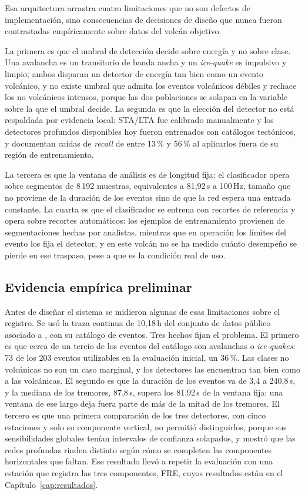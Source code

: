 Esa arquitectura arrastra cuatro limitaciones que no son defectos de
implementación, sino consecuencias de decisiones de diseño que nunca fueron
contrastadas empíricamente sobre datos del volcán objetivo.

La primera es que el umbral de detección decide sobre energía y no
sobre clase. Una avalancha es un transitorio de banda ancha y un
\emph{ice-quake} es impulsivo y limpio; ambos disparan un detector de energía
tan bien como un evento volcánico, y no existe umbral que admita los eventos
volcánicos débiles y rechace los no volcánicos intensos, porque las dos
poblaciones se solapan en la variable sobre la que el umbral decide. La segunda
es que la elección del detector no está respaldada por evidencia local:
STA/LTA fue calibrado manualmente y los detectores profundos disponibles hoy
fueron entrenados con catálogos tectónicos, y \textcite{jiang2021comparacion}
documentan caídas de \emph{recall} de entre 13\,\% y 56\,\% al aplicarlos fuera
de su región de entrenamiento.

La tercera es que la ventana de análisis es de longitud fija: el
clasificador opera sobre segmentos de 8\,192 muestras, equivalentes a 81,92\,s
a 100\,Hz, tamaño que no proviene de la duración de los eventos sino de que la
red espera una entrada constante. La cuarta es que el clasificador se
entrena con recortes de referencia y opera sobre recortes automáticos: los
ejemplos de entrenamiento provienen de segmentaciones hechas por analistas,
mientras que en operación los límites del evento los fija el detector, y en
este volcán no se ha medido cuánto desempeño se pierde en ese traspaso, pese a
que es la condición real de uso.

\subsection{Evidencia empírica preliminar}
\label{subsec:evidencia}

Antes de diseñar el sistema se midieron algunas de esas limitaciones sobre el
registro. Se usó la traza continua de 10,18\,h del conjunto de datos público
asociado a \textcite{espinosacurilem2026segmentacion}
\parencite{espinosacurilem2025dataset}, con su catálogo de eventos. Tres hechos
fijan el problema. El primero es que cerca de un tercio de los eventos del
catálogo son avalanchas o \emph{ice-quakes}: 73 de los 203 eventos utilizables
en la evaluación inicial, un 36\,\%. Las clases no volcánicas no son un caso
marginal, y los detectores las encuentran tan bien como a las volcánicas. El
segundo es que la duración de los eventos va de 3,4 a 240,8\,s, y la mediana de
los tremores, 87,8\,s, supera los 81,92\,s de la ventana fija: una ventana de
ese largo deja fuera parte de más de la mitad de los tremores. El tercero es que
una primera comparación de los tres detectores, con cinco estaciones y solo su
componente vertical, no permitió distinguirlos, porque sus sensibilidades
globales tenían intervalos de confianza solapados, y mostró que las redes
profundas rinden distinto según cómo se completen las componentes horizontales
que faltan. Ese resultado llevó a repetir la evaluación con una estación que
registra las tres componentes, FRE, cuyos resultados están en el
Capítulo~\ref{cap:resultados}.

